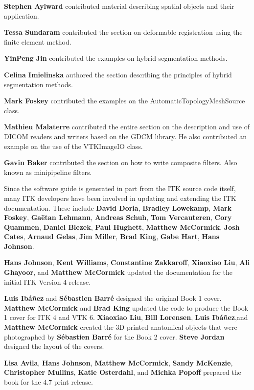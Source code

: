 {\bf Stephen Aylward} contributed material describing spatial objects and
their application.

{\bf Tessa Sundaram} contributed the section on deformable registration using
the finite element method.

{\bf YinPeng Jin} contributed the examples on  hybrid segmentation methods.

{\bf Celina Imielinska} authored the section describing the principles of
hybrid segmentation methods.

{\bf Mark Foskey} contributed the examples on the
AutomaticTopologyMeshSource class.

{\bf Mathieu Malaterre} contributed the entire section on the description and
use of DICOM readers and writers based on the GDCM library. He also contributed
an example on the use of the VTKImageIO class.

{\bf Gavin Baker} contributed the section on how to write composite filters.
Also known as minipipeline filters.

Since the software guide is generated in part from the ITK source code
itself, many ITK developers have been involved in updating and
extending the ITK documentation.  These include {\bf David Doria},
{\bf Bradley Lowekamp}, {\bf Mark Foskey}, {\bf Ga\"{e}tan Lehmann},
{\bf Andreas Schuh}, {\bf Tom Vercauteren}, {\bf Cory Quammen}, {\bf Daniel Blezek},
{\bf Paul Hughett}, {\bf Matthew McCormick}, {\bf Josh Cates}, {\bf Arnaud Gelas},
{\bf Jim Miller}, {\bf Brad King}, {\bf Gabe Hart}, {\bf Hans Johnson}.

{\bf Hans Johnson}, {\bf Kent Williams}, {\bf Constantine Zakkaroff}, {\bf
Xiaoxiao Liu}, {\bf Ali Ghayoor}, and {\bf Matthew McCormick} updated
the documentation for the initial ITK Version 4 release.

{\bf Luis Ib\'{a}\~{n}ez} and {\bf S\'{e}bastien Barr\'{e}} designed the
original Book 1 cover. {\bf Matthew McCormick} and {\bf Brad King} updated the
code to produce the Book 1 cover for ITK 4 and VTK 6. {\bf Xiaoxiao Liu},
{\bf Bill Lorensen}, {\bf Luis Ib\'{a}\~{n}ez},and {\bf Matthew McCormick}
created the 3D printed anatomical objects that were photographed by {\bf
S\'{e}bastien Barr\'{e}} for the Book 2 cover. {\bf Steve Jordan} designed the
layout of the covers.

{\bf Lisa Avila}, {\bf Hans Johnson}, {\bf Matthew McCormick}, {\bf Sandy
McKenzie}, {\bf Christopher Mullins}, {\bf Katie Osterdahl}, and {\bf Michka
Popoff} prepared the book for the 4.7 print release.
